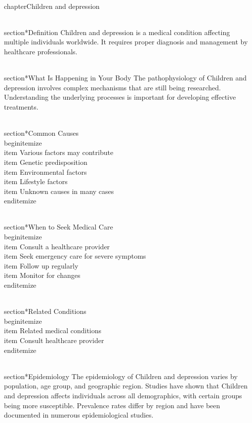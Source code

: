 
\\chapter{Children and depression}

\\section*{Definition}
Children and depression is a medical condition affecting multiple individuals worldwide. It requires proper diagnosis and management by healthcare professionals.

\\section*{What Is Happening in Your Body}
The pathophysiology of Children and depression involves complex mechanisms that are still being researched. Understanding the underlying processes is important for developing effective treatments.

\\section*{Common Causes}
\\begin{itemize}
\\item Various factors may contribute\n  \\item Genetic predisposition\n  \\item Environmental factors\n  \\item Lifestyle factors\n  \\item Unknown causes in many cases
\\end{itemize}

\\section*{When to Seek Medical Care}
\\begin{itemize}
\\item Consult a healthcare provider\n  \\item Seek emergency care for severe symptoms\n  \\item Follow up regularly\n  \\item Monitor for changes
\\end{itemize}

\\section*{Related Conditions}
\\begin{itemize}
\\item Related medical conditions\n  \\item Consult healthcare provider
\\end{itemize}

\\section*{Epidemiology}
The epidemiology of Children and depression varies by population, age group, and geographic region. Studies have shown that Children and depression affects individuals across all demographics, with certain groups being more susceptible. Prevalence rates differ by region and have been documented in numerous epidemiological studies.

